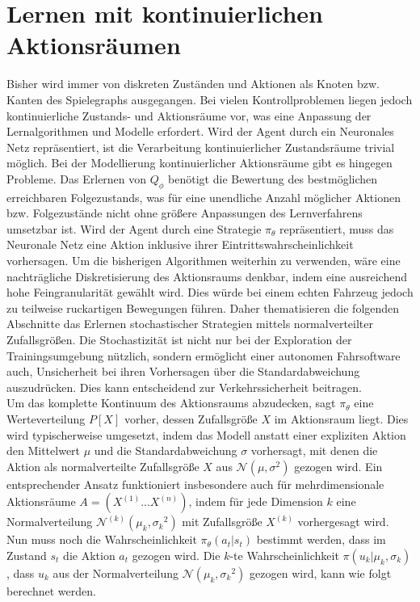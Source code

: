 \section{Lernen mit kontinuierlichen Aktionsräumen}
Bisher wird immer von diskreten Zuständen und Aktionen als Knoten bzw. Kanten des
Spielegraphs ausgegangen. Bei vielen Kontrollproblemen liegen jedoch kontinuierliche
Zustands- und Aktionsräume vor, was eine Anpassung der Lernalgorithmen und Modelle
erfordert. Wird der Agent durch ein Neuronales Netz repräsentiert, ist die Verarbeitung
kontinuierlicher Zustandsräume trivial möglich. Bei der Modellierung kontinuierlicher
Aktionsräume gibt es hingegen Probleme. Das Erlernen von $Q_\phi$ benötigt die Bewertung
des bestmöglichen erreichbaren Folgezustands, was für eine unendliche Anzahl möglicher
Aktionen bzw. Folgezustände nicht ohne größere Anpassungen des Lernverfahrens umsetzbar ist.
Wird der Agent durch eine Strategie $\pi_\theta$ repräsentiert, muss das Neuronale Netz
eine Aktion inklusive ihrer Eintrittswahrscheinlichkeit vorhersagen. Um die bisherigen
Algorithmen weiterhin zu verwenden, wäre eine nachträgliche Diskretisierung des
Aktionsraums denkbar, indem eine ausreichend hohe Feingranularität gewählt wird.
Dies würde bei einem echten Fahrzeug jedoch zu teilweise ruckartigen Bewegungen führen.
Daher thematisieren die folgenden Abschnitte das Erlernen stochastischer Strategien
mittels normalverteilter Zufallsgrößen. Die Stochastizität ist nicht nur bei der
Exploration der Trainingsumgebung nützlich, sondern ermöglicht einer autonomen
Fahrsoftware auch, Unsicherheit bei ihren Vorhersagen über die Standardabweichung
auszudrücken. Dies kann entscheidend zur Verkehrssicherheit beitragen.\\

Um das komplette Kontinuum des Aktionsraums abzudecken, sagt $\pi_\theta$ eine
Werteverteilung $P[X]$ vorher, dessen Zufallsgröße $X$ im Aktionsraum liegt.
Dies wird typischerweise umgesetzt, indem das Modell anstatt einer expliziten Aktion
den Mittelwert $\mu$ und die Standardabweichung $\sigma$ vorhersagt, mit denen
die Aktion als normalverteilte Zufallsgröße $X$ aus $\mathcal{N}(\mu, {\sigma}^{2})$
gezogen wird. Ein entsprechender Ansatz funktioniert insbesondere auch für mehrdimensionale
Aktionsräume $A = ( X^{(1)} ... X^{(n)} )$, indem für jede Dimension $k$ eine
Normalverteilung $\mathcal{N}^{(k)}(\mu_k, {\sigma_k}^{2})$ mit Zufallsgröße $X^{(k)}$
vorhergesagt wird. Nun muss noch die Wahrscheinlichkeit $\pi_\theta(a_t | s_t)$
bestimmt werden, dass im Zustand $s_t$ die Aktion $a_t$ gezogen wird. Die $k$-te
Wahrscheinlichkeit $\pi(u_k | \mu_k, \sigma_k)$, dass $u_k$ aus der Normalverteilung
$\mathcal{N}(\mu_k, {\sigma_k}^{2})$ gezogen wird, kann wie folgt berechnet werden.

